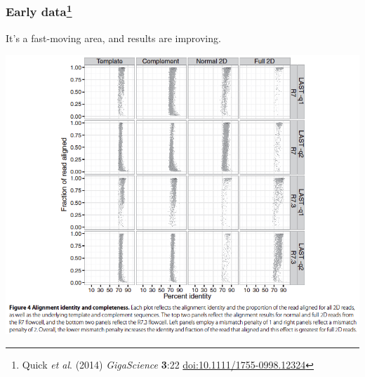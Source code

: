 \begin{frame}
  \frametitle{Early data\footnote{\tiny{Quick \textit{et al}. (2014) \textit{GigaScience} \textbf{3}:22 \href{http://dx.doi.org/10.1111/1755-0998.12324}{doi:10.1111/1755-0998.12324}}}}
  It's a fast-moving area, and results are improving.
    \begin{center}
      \includegraphics[height=0.65\textheight]{images/nanopore_quick}
    \end{center}           
\end{frame}

